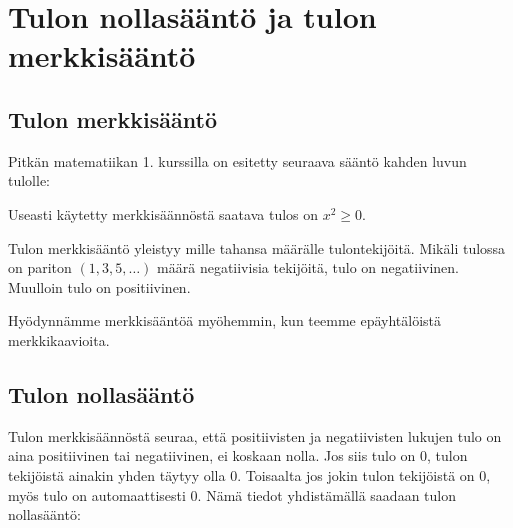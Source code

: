 \section{Tulon nollasääntö ja tulon merkkisääntö}

\subsection*{Tulon merkkisääntö}

Pitkän matematiikan 1. kurssilla on esitetty seuraava sääntö kahden luvun tulolle:


Useasti käytetty merkkisäännöstä saatava tulos on $x^2 \geq 0$.

Tulon merkkisääntö yleistyy mille tahansa määrälle tulontekijöitä.
Mikäli tulossa on pariton $(1, 3, 5, \ldots)$ määrä negatiivisia tekijöitä, tulo on negatiivinen.
Muulloin tulo on positiivinen.

Hyödynnämme merkkisääntöä myöhemmin, kun teemme epäyhtälöistä merkkikaavioita.

\subsection*{Tulon nollasääntö}

Tulon merkkisäännöstä seuraa, että positiivisten ja negatiivisten lukujen tulo on aina positiivinen tai negatiivinen, ei koskaan nolla.
Jos siis tulo on $0$, tulon tekijöistä ainakin yhden täytyy olla $0$.
Toisaalta jos jokin tulon tekijöistä on $0$, myös tulo on automaattisesti $0$.
Nämä tiedot yhdistämällä saadaan tulon nollasääntö:

